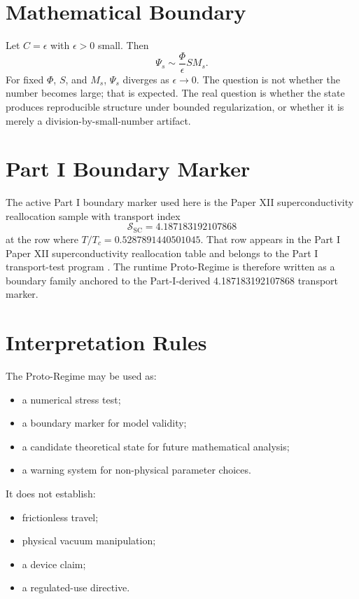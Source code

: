 \documentclass[12pt,a4paper]{article}
\begin{document}
\section{Mathematical Boundary}
Let $C=\epsilon$ with $\epsilon>0$ small. Then
\begin{equation}
    \Psi_s \sim \frac{\Phi}{\epsilon}S M_s.
\end{equation}
For fixed $\Phi$, $S$, and $M_s$, $\Psi_s$ diverges as $\epsilon \to 0$. The
question is not whether the number becomes large; that is expected. The real
question is whether the state produces reproducible structure under bounded
regularization, or whether it is merely a division-by-small-number artifact.

\section{Part I Boundary Marker}
The active Part I boundary marker used here is the Paper XII superconductivity
reallocation sample with transport index
\[
    \mathcal{S}_{\mathrm{SC}}=4.187183192107868
\]
at the row where \(T/T_c=0.5287891440501045\). That row appears in the Part I
Paper XII superconductivity reallocation table and belongs to the Part I
transport-test program \cite{MujjabiXII2026}. The runtime Proto-Regime is
therefore written as a boundary family anchored to the Part-I-derived
4.187183192107868 transport marker.

\section{Interpretation Rules}
The Proto-Regime may be used as:
\begin{itemize}
    \item a numerical stress test;
    \item a boundary marker for model validity;
    \item a candidate theoretical state for future mathematical analysis;
    \item a warning system for non-physical parameter choices.
\end{itemize}
It does not establish:
\begin{itemize}
    \item frictionless travel;
    \item physical vacuum manipulation;
    \item a device claim;
    \item a regulated-use directive.
\end{itemize}
\end{document}
